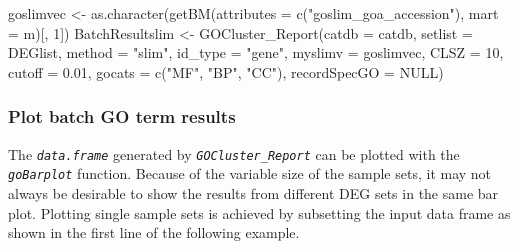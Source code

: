 \documentclass[14pt,]{article}
\newcommand{\hlnum}[1]{\textcolor[rgb]{0.816,0.125,0.439}{#1}}%
\newcommand{\hlstr}[1]{\textcolor[rgb]{0.251,0.627,0.251}{#1}}%
\newcommand{\hlstd}[1]{\textcolor[rgb]{0.251,0.251,0.251}{#1}}%
\newenvironment{Shaded}{\begin{myshaded}}{\end{myshaded}}
\newcommand{\DecValTok}[1]{\hlnum{#1}}
\newcommand{\FloatTok}[1]{\hlnum{#1}}
\newcommand{\ConstantTok}[1]{\hlnum{#1}}
\newcommand{\SpecialCharTok}[1]{\hlstr{#1}}
\newcommand{\StringTok}[1]{\hlstr{#1}}
\newcommand{\OtherTok}[1]{{#1}}
\newcommand{\FunctionTok}[1]{\hlstd{#1}}
\newcommand{\AttributeTok}[1]{{#1}}
\newcommand{\NormalTok}[1]{\hlstd{#1}}
\begin{document}
\begin{Shaded}
\begin{Highlighting}[]
\NormalTok{goslimvec }\OtherTok{\textless{}{-}} \FunctionTok{as.character}\NormalTok{(}\FunctionTok{getBM}\NormalTok{(}\AttributeTok{attributes =} \FunctionTok{c}\NormalTok{(}\StringTok{"goslim\_goa\_accession"}\NormalTok{), }\AttributeTok{mart =}\NormalTok{ m)[, }
    \DecValTok{1}\NormalTok{])}
\NormalTok{BatchResultslim }\OtherTok{\textless{}{-}} \FunctionTok{GOCluster\_Report}\NormalTok{(}\AttributeTok{catdb =}\NormalTok{ catdb, }\AttributeTok{setlist =}\NormalTok{ DEGlist, }\AttributeTok{method =} \StringTok{"slim"}\NormalTok{, }
    \AttributeTok{id\_type =} \StringTok{"gene"}\NormalTok{, }\AttributeTok{myslimv =}\NormalTok{ goslimvec, }\AttributeTok{CLSZ =} \DecValTok{10}\NormalTok{, }\AttributeTok{cutoff =} \FloatTok{0.01}\NormalTok{, }\AttributeTok{gocats =} \FunctionTok{c}\NormalTok{(}\StringTok{"MF"}\NormalTok{, }
        \StringTok{"BP"}\NormalTok{, }\StringTok{"CC"}\NormalTok{), }\AttributeTok{recordSpecGO =} \ConstantTok{NULL}\NormalTok{)}
\end{Highlighting}
\end{Shaded}

\hypertarget{plot-batch-go-term-results}{%
\subsubsection{Plot batch GO term results}\label{plot-batch-go-term-results}}

The \emph{\texttt{data.frame}} generated by \emph{\texttt{GOCluster\_Report}} can be plotted with the \emph{\texttt{goBarplot}} function. Because of the variable size of the sample sets, it may not always be desirable to show the results from different DEG sets in the same bar plot. Plotting single sample sets is achieved by subsetting the input data frame as shown in the first line of the following example.

\begin{Shaded}
\end{Shaded}
\end{document}
